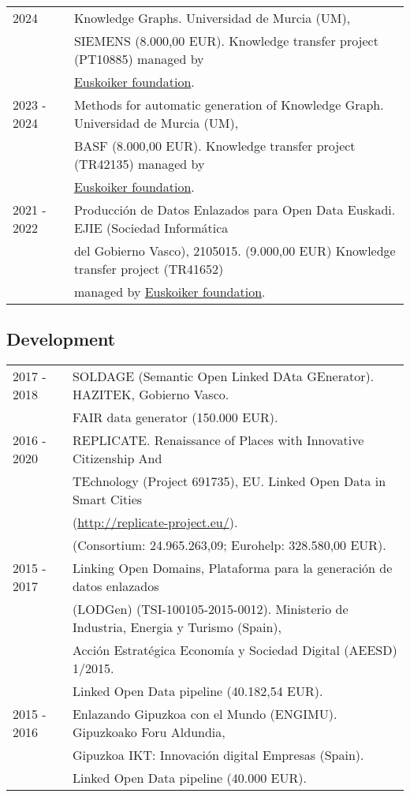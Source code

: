 \documentclass[11pt,fullpage]{article}
\begin{document}
\begin{tabular}{ll}
2024        &  Knowledge Graphs. Universidad de Murcia (UM), \\ 
            &  SIEMENS (8.000,00 EUR). Knowledge transfer project (PT10885) managed by \\ 
            & \href{http://www.euskoiker.ehu.es/faq-3}{Euskoiker foundation}. \\
2023 - 2024 &  Methods for automatic generation of Knowledge Graph. Universidad de Murcia (UM), \\ 
            &  BASF (8.000,00 EUR). Knowledge transfer project (TR42135) managed by \\ 
            & \href{http://www.euskoiker.ehu.es/faq-3}{Euskoiker foundation}. \\
2021 - 2022 &  Producci\'on de Datos Enlazados para Open Data Euskadi. EJIE (Sociedad Inform\'atica \\ 
            &  del Gobierno Vasco), 2105015. (9.000,00 EUR) Knowledge transfer project (TR41652) \\ 
            &  managed by \href{http://www.euskoiker.ehu.es/faq-3}{Euskoiker foundation}. \\ 
\end{tabular}

\subsection*{Development}

\begin{tabular}{ll}

2017 - 2018 & SOLDAGE (Semantic Open Linked DAta GEnerator). HAZITEK, Gobierno Vasco. \\
            & FAIR data generator (150.000 EUR). \\
2016 - 2020 & REPLICATE. Renaissance of Places with Innovative Citizenship And \\
            & TEchnology (Project 691735), EU. Linked Open Data in Smart Cities \\
            & (\href{http://replicate-project.eu/}{http://replicate-project.eu/}). \\
            & (Consortium: 24.965.263,09; Eurohelp: 328.580,00 EUR).  \\
2015 - 2017 & Linking Open Domains, Plataforma para la generaci\'on de datos enlazados  \\
            & (LODGen) (TSI-100105-2015-0012). Ministerio de Industria, Energia y Turismo (Spain), \\
            & Acción Estratégica Economía y Sociedad Digital (AEESD) 1/2015.  \\
            & Linked Open Data pipeline (40.182,54 EUR). \\
2015 - 2016 & Enlazando Gipuzkoa con el Mundo (ENGIMU). Gipuzkoako Foru Aldundia,  \\
            & Gipuzkoa IKT: Innovaci\'on digital Empresas (Spain).\\
            & Linked Open Data pipeline (40.000 EUR). \\
\end{tabular}
\end{document}
